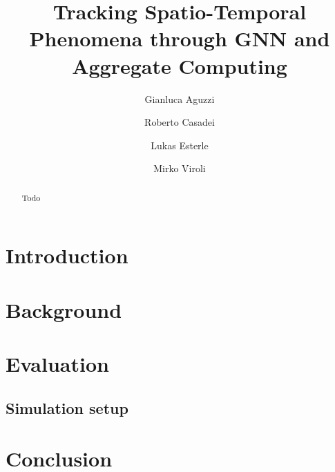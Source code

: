 \documentclass[runningheads]{llncs}
\begin{document}
%
\title{Tracking Spatio-Temporal Phenomena through GNN and Aggregate Computing} %
%
\author{Gianluca Aguzzi \and
Roberto Casadei \and
Lukas Esterle   \and
Mirko Viroli }
%
%

%
\maketitle              %
%
\begin{abstract}
Todo

\end{abstract}
%
\section{Introduction}

\section{Background}


\section{Evaluation}
\subsection{Simulation setup}


\section{Conclusion}
\end{document}
